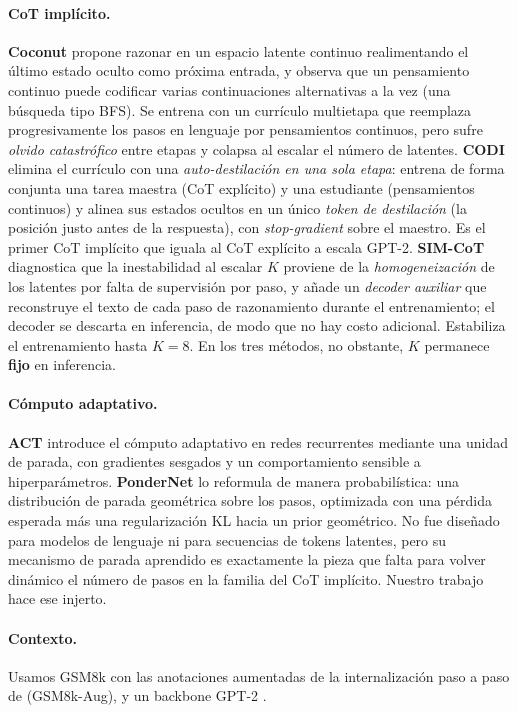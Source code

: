 \documentclass[11pt]{article}
\begin{document}
\paragraph{CoT implícito.} \textbf{Coconut} \citep{hao2024coconut} propone razonar en un espacio latente continuo realimentando el último estado oculto como próxima entrada, y observa que un pensamiento continuo puede codificar varias continuaciones alternativas a la vez (una búsqueda tipo BFS). Se entrena con un currículo multietapa que reemplaza progresivamente los pasos en lenguaje por pensamientos continuos, pero sufre \emph{olvido catastrófico} entre etapas y colapsa al escalar el número de latentes. \textbf{CODI} \citep{shen2025codi} elimina el currículo con una \emph{auto-destilación en una sola etapa}: entrena de forma conjunta una tarea maestra (CoT explícito) y una estudiante (pensamientos continuos) y alinea sus estados ocultos en un único \emph{token de destilación} (la posición justo antes de la respuesta), con \textit{stop-gradient} sobre el maestro. Es el primer CoT implícito que iguala al CoT explícito a escala GPT-2. \textbf{SIM-CoT} \citep{wei2025simcot} diagnostica que la inestabilidad al escalar $K$ proviene de la \emph{homogeneización} de los latentes por falta de supervisión por paso, y añade un \emph{decoder auxiliar} que reconstruye el texto de cada paso de razonamiento durante el entrenamiento; el decoder se descarta en inferencia, de modo que no hay costo adicional. Estabiliza el entrenamiento hasta $K=8$. En los tres métodos, no obstante, $K$ permanece \textbf{fijo} en inferencia.

\paragraph{Cómputo adaptativo.} \textbf{ACT} \citep{graves2016act} introduce el cómputo adaptativo en redes recurrentes mediante una unidad de parada, con gradientes sesgados y un comportamiento sensible a hiperparámetros. \textbf{PonderNet} \citep{banino2021pondernet} lo reformula de manera probabilística: una distribución de parada geométrica sobre los pasos, optimizada con una pérdida esperada más una regularización KL hacia un prior geométrico. No fue diseñado para modelos de lenguaje ni para secuencias de tokens latentes, pero su mecanismo de parada aprendido es exactamente la pieza que falta para volver dinámico el número de pasos en la familia del CoT implícito. Nuestro trabajo hace ese injerto.

\paragraph{Contexto.} Usamos GSM8k \citep{cobbe2021gsm8k} con las anotaciones aumentadas de la internalización paso a paso de \citet{deng2024icot} (GSM8k-Aug), y un backbone GPT-2 \citep{radford2019gpt2}.
\end{document}
